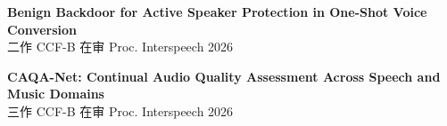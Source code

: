 \documentclass[a4paper,10pt]{article}
\begin{document}
\begin{enumerate}[leftmargin=*, after=\strut, label={[\arabic*]}]
    \item \textbf{Benign Backdoor for Active Speaker Protection in One-Shot Voice Conversion}\\
    {\small 二作 \quad CCF-B \quad 在审 \quad Proc. Interspeech 2026}

    \item \textbf{CAQA-Net: Continual Audio Quality Assessment Across Speech and Music Domains}\\
    {\small 三作 \quad CCF-B \quad 在审 \quad Proc. Interspeech 2026}
\end{enumerate}
\end{document}
